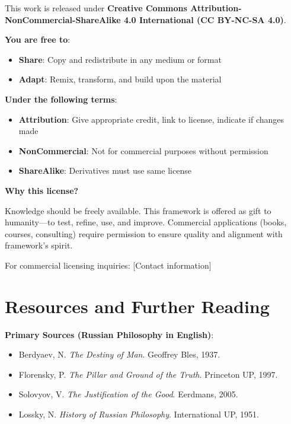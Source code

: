 \documentclass[11pt,a4paper]{article}
\theoremstyle{definition}
\theoremstyle{remark}
\begin{document}
\begin{small}
\begin{enumerate}
\begin{protocol}
This work is released under \textbf{Creative Commons Attribution-NonCommercial-ShareAlike 4.0 International (CC BY-NC-SA 4.0)}.

\textbf{You are free to}:
\begin{itemize}
    \item \textbf{Share}: Copy and redistribute in any medium or format
    \item \textbf{Adapt}: Remix, transform, and build upon the material
\end{itemize}

\textbf{Under the following terms}:
\begin{itemize}
    \item \textbf{Attribution}: Give appropriate credit, link to license, indicate if changes made
    \item \textbf{NonCommercial}: Not for commercial purposes without permission
    \item \textbf{ShareAlike}: Derivatives must use same license
\end{itemize}

\textbf{Why this license?}

Knowledge should be freely available. This framework is offered as gift to humanity—to test, refine, use, and improve. Commercial applications (books, courses, consulting) require permission to ensure quality and alignment with framework's spirit.

For commercial licensing inquiries: [Contact information]

\vspace{2em}

\section*{Resources and Further Reading}

\textbf{Primary Sources (Russian Philosophy in English)}:
\begin{itemize}
    \item Berdyaev, N. \textit{The Destiny of Man}. Geoffrey Bles, 1937.
    \item Florensky, P. \textit{The Pillar and Ground of the Truth}. Princeton UP, 1997.
    \item Solovyov, V. \textit{The Justification of the Good}. Eerdmans, 2005.
    \item Lossky, N. \textit{History of Russian Philosophy}. International UP, 1951.
\end{itemize}


\end{protocol}
\end{enumerate}
\end{small}
\end{document}
